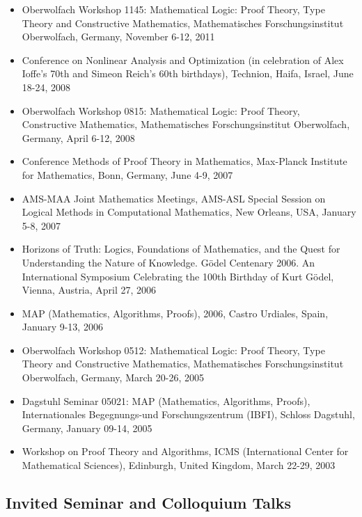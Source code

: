 \documentclass[12pt]{article}
\begin{document}
\begin{itemize}
\item Oberwolfach Workshop 1145:  Mathematical Logic: Proof Theory, Type Theory and Constructive Mathematics,  
Mathematisches Forschungsinstitut Oberwolfach, Germany, November 6-12, 2011

\item Conference on Nonlinear Analysis and Optimization (in celebration of Alex Ioffe's 70th and Simeon Reich's 60th birthdays), 
Technion, Haifa, Israel, June 18-24, 2008

\item Oberwolfach Workshop 0815:   Mathematical Logic: Proof Theory, Constructive Mathematics,  
Mathematisches Forschungsinstitut Oberwolfach, Germany, April 6-12, 2008

\item Conference Methods of Proof Theory in Mathematics, Max-Planck Institute for Mathematics, Bonn, Germany,  June 4-9, 2007
 
 \item AMS-MAA Joint Mathematics Meetings, AMS-ASL Special Session on Logical Methods in Computational Mathematics, New Orleans, USA, January 5-8, 2007

\item  Horizons of Truth: Logics, Foundations of Mathematics, and the Quest for Understanding the 
 Nature of Knowledge. G\" odel Centenary 2006. An International Symposium Celebrating the 100th 
 Birthday of Kurt G\" odel, Vienna, Austria, April 27, 2006
 
\item MAP   (Mathematics, Algorithms, Proofs),  2006, Castro Urdiales, Spain, January 9-13, 2006

\item Oberwolfach Workshop 0512:  Mathematical Logic: Proof Theory, Type Theory and Constructive Mathematics,  Mathematisches Forschungsinstitut Oberwolfach, Germany, March 20-26, 2005

\item Dagstuhl Seminar 05021: MAP   (Mathematics, Algorithms, Proofs),   Internationales Begegnungs-und Forschungszentrum (IBFI),  Schloss Dagstuhl, Germany, January 09-14, 2005

\item Workshop on Proof Theory and Algorithms, ICMS (International Center for Mathematical Sciences), 
 Edinburgh, United Kingdom, March 22-29, 2003
 
\end{itemize}

\subsection*{Invited Seminar and Colloquium Talks}
\end{document}
